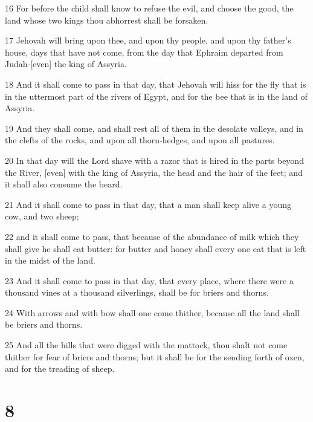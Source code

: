 \par 16 For before the child shall know to refuse the evil, and choose the good, the land whose two kings thou abhorrest shall be forsaken.
\par 17 Jehovah will bring upon thee, and upon thy people, and upon thy father's house, days that have not come, from the day that Ephraim departed from Judah-[even] the king of Assyria.
\par 18 And it shall come to pass in that day, that Jehovah will hiss for the fly that is in the uttermost part of the rivers of Egypt, and for the bee that is in the land of Assyria.
\par 19 And they shall come, and shall rest all of them in the desolate valleys, and in the clefts of the rocks, and upon all thorn-hedges, and upon all pastures.
\par 20 In that day will the Lord shave with a razor that is hired in the parts beyond the River, [even] with the king of Assyria, the head and the hair of the feet; and it shall also consume the beard.
\par 21 And it shall come to pass in that day, that a man shall keep alive a young cow, and two sheep;
\par 22 and it shall come to pass, that because of the abundance of milk which they shall give he shall eat butter: for butter and honey shall every one eat that is left in the midst of the land.
\par 23 And it shall come to pass in that day, that every place, where there were a thousand vines at a thousand silverlings, shall be for briers and thorns.
\par 24 With arrows and with bow shall one come thither, because all the land shall be briers and thorns.
\par 25 And all the hills that were digged with the mattock, thou shalt not come thither for fear of briers and thorns; but it shall be for the sending forth of oxen, and for the treading of sheep.

\chapter{8}

